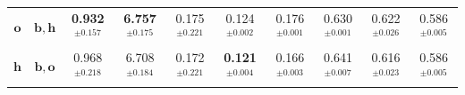 \begin{table}
{\begin{tabular}{@{}cccccccccc@{}}
        $\boldsymbol{o}$ & $\boldsymbol{b}, \boldsymbol{h}$ 
        & \textbf{0.932}$^{\pm0.157}$  & \textbf{6.757}$^{\pm0.175}$ & 0.175$^{\pm0.221}$ & 0.124$^{\pm0.002}$ & {0.176}$^{\pm0.001}$ & 0.630$^{\pm0.001}$ & 0.622$^{\pm0.026}$ & 0.586$^{\pm0.005}$\\
        
        $\boldsymbol{h}$ & $\boldsymbol{b}, \boldsymbol{o}$ 
        & 0.968$^{\pm0.218}$  & 6.708$^{\pm0.184}$ & 0.172$^{\pm0.221}$ & \textbf{0.121}$^{\pm0.004}$ & 0.166$^{\pm0.003}$ & 0.641$^{\pm0.007}$ & 0.616$^{\pm0.023}$ & 0.586$^{\pm0.005}$\\
        
        \bottomrule
    \end{tabular}}%
\end{table}